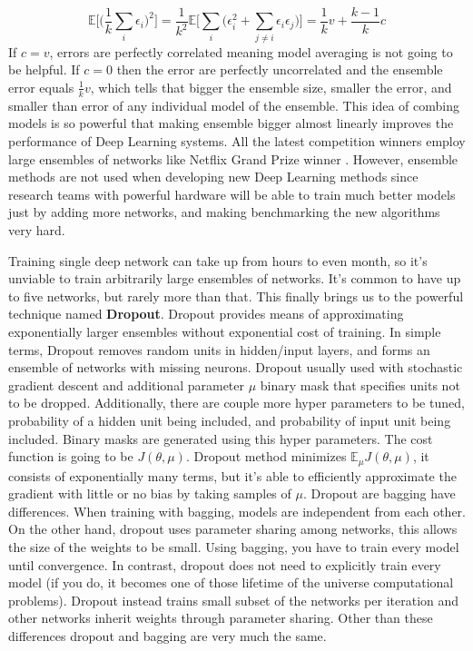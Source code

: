 \documentclass[paper=a4, fontsize=11pt]{scrartcl}
\numberwithin{equation}{section}		%
\numberwithin{figure}{section}			%
\numberwithin{table}{section}			%
\begin{document}
	$$
	\mathbb E\bigg[\bigg(\frac{1}{k}\sum_i \epsilon_i\bigg)^2\bigg] = \frac{1}{k^2}\mathbb E\bigg[  \sum_i\bigg( \epsilon_i^2 + \sum_{j \not = i} \epsilon_i\epsilon_j \bigg) \bigg] = \frac{1}{k}v + \frac{k-1}{k}c
	$$
	If $c = v $, errors are perfectly correlated meaning model averaging is not going to be helpful. If $c=0$
	then the error are perfectly uncorrelated and the ensemble error equals $\frac{1}{k}v$, which tells that bigger the ensemble size, smaller the error, and smaller than error of any individual model of the ensemble.
	This idea of combing models is so powerful that making ensemble bigger almost linearly improves the performance of Deep Learning systems. All the latest competition winners employ large ensembles of networks like Netflix Grand Prize winner \cite{5197422}. However, ensemble methods are not used when developing new Deep Learning methods since research teams with powerful hardware will be able to train much better models just by adding more networks, and making benchmarking the new algorithms very hard.
	\par
	Training single deep network can take up from hours to even month, so it's unviable to train arbitrarily large ensembles of networks. It's common to have up to five networks, but rarely more than that. This finally brings us to the powerful technique named \textbf{Dropout}. Dropout provides means of approximating exponentially larger ensembles without exponential cost of training.  In simple terms, Dropout removes random units in hidden/input layers, and forms an ensemble of networks with missing neurons. Dropout usually used with stochastic gradient descent and additional parameter $\mu$ binary mask that specifies units not to be dropped. Additionally, there are couple more hyper parameters to be tuned, probability of a hidden unit being included, and probability of input unit being included. Binary masks are generated using this hyper parameters. The cost function is going to be $J(\theta, \mu)$. Dropout method minimizes $\mathbb E_\mu J(\theta, \mu)$, it consists of exponentially many terms, but it's able to efficiently approximate the gradient with little or no bias by taking samples of $\mu$. Dropout are bagging have differences. When training with bagging, models are independent from each other. On the other hand, dropout uses parameter sharing among networks, this allows the size of the weights to be small. Using bagging, you have to train every model until convergence. In contrast, dropout does not need to explicitly train every model (if you do, it becomes one of those lifetime of the universe computational problems). Dropout instead trains small subset of the networks per iteration and other networks inherit weights through parameter sharing. Other than these differences dropout and bagging are very much the same.
\end{document}
